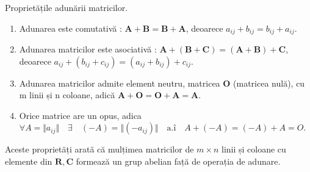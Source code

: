 Proprietățile adunării matricilor.
\begin{enumerate}
  \item Adunarea este comutativă : $\mathbf{A + B = B + A}$, deoarece
  $\mathit{a_{ij} + b_{ij} = b_{ij} + a_{ij}}$.
  \item Adunarea matricilor este asociativă : $\mathbf{A + (B + C) = (A + B) +
  C}$, deoarece $\mathit{a_{ij} + (b_{ij} + c_{ij}) = (a_{ij} + b_{ij}) +
  c_{ij}}$.
  \item Adunarea matricilor admite element neutru, matricea \textbf{O}
  (matricea nulă), cu m linii și n coloane, adică $\mathbf{A + O = O + A = A}$.
  \item Orice matrice are un opus, adica $\forall A = \Vert a_{ij} \Vert \quad
   \exists \quad (-A) = \Vert (-a_{ij}) \Vert \quad \text{a.î} \quad 
   A + (-A) = (-A) + A = O$.
\end{enumerate}
Aceste proprietăți arată că mulțimea matricilor de $m \times n$ linii și
coloane cu elemente din $\mathbf{R, C}$ formează un grup abelian față de
operația de adunare.
